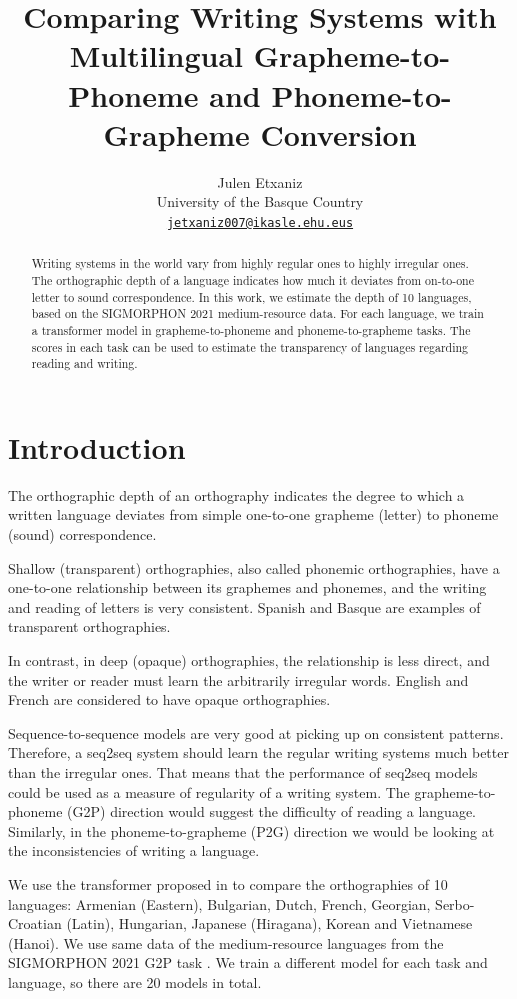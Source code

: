 \documentclass[11pt,a4paper]{article}
\title{Comparing Writing Systems with Multilingual Grapheme-to-Phoneme and Phoneme-to-Grapheme Conversion}
\author{Julen Etxaniz \\
  University of the Basque Country\\
  \texttt{\href{mailto:jetxaniz007@ikasle.ehu.eus}{jetxaniz007@ikasle.ehu.eus}}}
\date{}
\begin{document}
\maketitle

\begin{abstract}
Writing systems in the world vary from highly regular ones to highly irregular ones. The orthographic depth of a language indicates how much it deviates from on-to-one letter to sound correspondence. In this work, we estimate the depth of 10 languages, based on the SIGMORPHON 2021 medium-resource data. For each language, we train a transformer model in grapheme-to-phoneme and phoneme-to-grapheme tasks. The scores in each task can be used to estimate the transparency of languages regarding reading and writing.
\end{abstract}

\section{Introduction}

The orthographic depth of an orthography indicates the degree to which a written language deviates from simple one-to-one grapheme (letter) to phoneme (sound) correspondence. 

Shallow (transparent) orthographies, also called phonemic orthographies, have a one-to-one relationship between its graphemes and phonemes, and the writing and reading of letters is very consistent. Spanish and Basque are examples of transparent orthographies.

In contrast, in deep (opaque) orthographies, the relationship is less direct, and the writer or reader must learn the arbitrarily irregular words. English and French are considered to have opaque orthographies.

Sequence-to-sequence models are very good at picking up on consistent patterns. Therefore, a seq2seq system should learn the regular writing systems much better than the irregular ones. That means that the performance of seq2seq models could be used as a measure of regularity of a writing system. The grapheme-to-phoneme (G2P) direction would suggest the difficulty of reading a language. Similarly, in the phoneme-to-grapheme (P2G) direction we would be looking at the inconsistencies of writing a language.

We use the transformer proposed in \citet{wu2021applying} to compare the orthographies of 10 languages: Armenian (Eastern), Bulgarian, Dutch, French, Georgian, Serbo-Croatian (Latin), Hungarian, Japanese (Hiragana), Korean and Vietnamese (Hanoi). We use same data of the medium-resource languages from the SIGMORPHON 2021 G2P task \cite{ashby-etal-2021-results}. We train a different model for each task and language, so there are 20 models in total.
\end{document}
